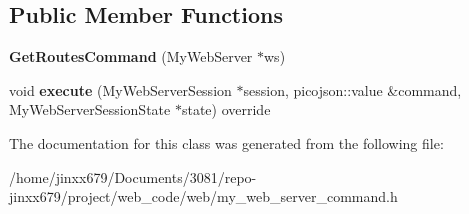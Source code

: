 \subsection*{Public Member Functions}
\begin{DoxyCompactItemize}
\item 
\mbox{\label{classGetRoutesCommand_a09048a49cf4545e0ac21aab10118f157}} 
{\bfseries Get\+Routes\+Command} (My\+Web\+Server $\ast$ws)
\item 
\mbox{\label{classGetRoutesCommand_ab0fc4d783fd5117fbb56520d9d2331f1}} 
void {\bfseries execute} (My\+Web\+Server\+Session $\ast$session, picojson\+::value \&command, My\+Web\+Server\+Session\+State $\ast$state) override
\end{DoxyCompactItemize}


The documentation for this class was generated from the following file\+:\begin{DoxyCompactItemize}
\item 
/home/jinxx679/\+Documents/3081/repo-\/jinxx679/project/web\+\_\+code/web/my\+\_\+web\+\_\+server\+\_\+command.\+h\end{DoxyCompactItemize}

